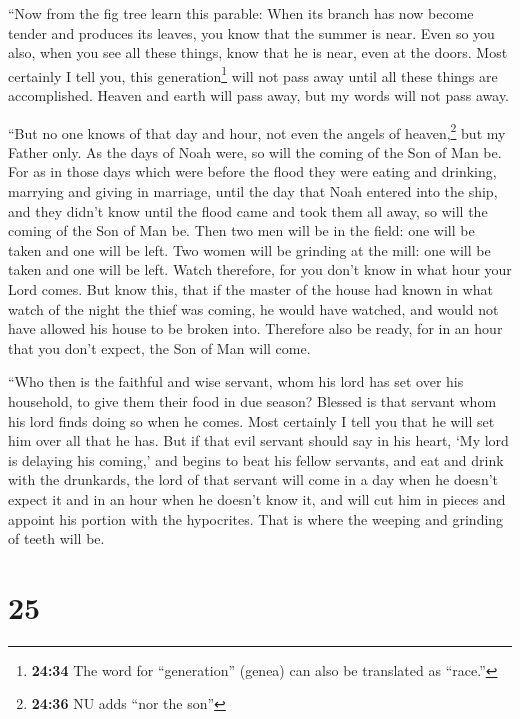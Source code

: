  ``Now from the fig tree learn this parable: When its
branch has now become tender and produces its leaves, you know that the
summer is near.  Even so you also, when you see all these
things, know that he is near, even at the doors.  Most
certainly I tell you, this generation\footnote{\textbf{24:34} The word
  for ``generation'' (genea) can also be translated as ``race.''} will
not pass away until all these things are accomplished. 
Heaven and earth will pass away, but my words will not pass away.

 ``But no one knows of that day and hour, not even the
angels of heaven,\footnote{\textbf{24:36} NU adds ``nor the son''} but
my Father only.  As the days of Noah were, so will the
coming of the Son of Man be.  For as in those days which
were before the flood they were eating and drinking, marrying and giving
in marriage, until the day that Noah entered into the ship,
 and they didn't know until the flood came and took them
all away, so will the coming of the Son of Man be.  Then
two men will be in the field: one will be taken and one will be left.
 Two women will be grinding at the mill: one will be
taken and one will be left.  Watch therefore, for you
don't know in what hour your Lord comes.  But know this,
that if the master of the house had known in what watch of the night the
thief was coming, he would have watched, and would not have allowed his
house to be broken into.  Therefore also be ready, for in
an hour that you don't expect, the Son of Man will come.

 ``Who then is the faithful and wise servant, whom his
lord has set over his household, to give them their food in due season?
 Blessed is that servant whom his lord finds doing so
when he comes.  Most certainly I tell you that he will
set him over all that he has.  But if that evil servant
should say in his heart, `My lord is delaying his coming,'
 and begins to beat his fellow servants, and eat and
drink with the drunkards,  the lord of that servant will
come in a day when he doesn't expect it and in an hour when he doesn't
know it,  and will cut him in pieces and appoint his
portion with the hypocrites. That is where the weeping and grinding of
teeth will be.

\hypertarget{section-24}{%
\section{25}\label{section-24}}

